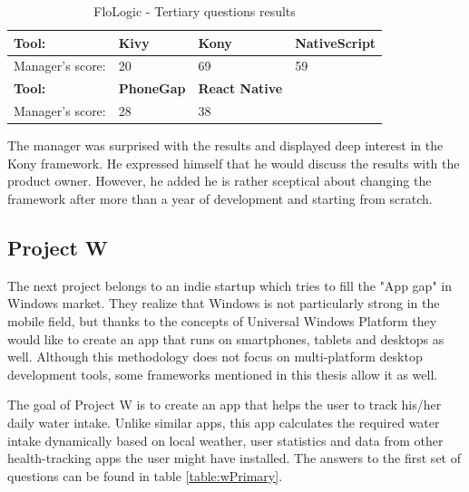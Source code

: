 \documentclass[english,master,public,dept460,male,cpdeclaration,oneside]{diploma}
\begin{document}
\begin{table}[!h]
\centering
\caption{FloLogic - Tertiary questions results}
\label{table:flologicResults3}
	\begin{tabular}{p{4cm} | p{3cm} | p{3cm} | p{3cm}}
		\toprule		
		\textbf{Tool:} & \textbf{Kivy} & \textbf{Kony} & \textbf{NativeScript} \\
		\midrule
		Manager’s score: & 20 & 69 & 59 \\
		\midrule
		\textbf{Tool:} & \textbf{PhoneGap} & \textbf{React Native} & \\
		\midrule
		Manager’s score: & 28 & 38 & \\		
		\midrule
	\end{tabular}
\end{table}

The manager was surprised with the results and displayed deep interest in the Kony framework. He expressed himself that he would discuss the results with the product owner. However, he added he is rather sceptical about changing the framework after more than a year of development and starting from scratch.

\subsection{Project W}

The next project belongs to an indie startup which tries to fill the "App gap" in Windows market. They realize that Windows is not particularly strong in the mobile field, but thanks to the concepts of Universal Windows Platform they would like to create an app that runs on smartphones, tablets and desktops as well. Although this methodology does not focus on multi-platform desktop development tools, some frameworks mentioned in this thesis allow it as well.

The goal of Project W is to create an app that helps the user to track his/her daily water intake. Unlike similar apps, this app calculates the required water intake dynamically based on local weather, user statistics and data from other health-tracking apps the user might have installed. The answers to the first set of questions can be found in table \ref{table:wPrimary}.
\end{document}
